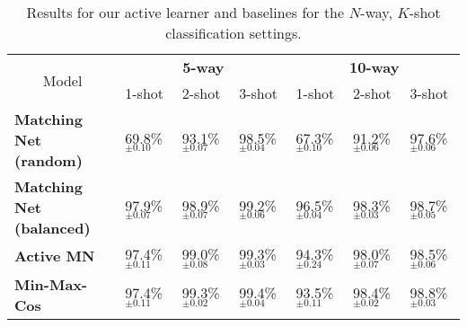 

\begin{table*}[]
\centering
\caption{Results for our active learner and baselines for the $N$-way, $K$-shot classification settings.}
\label{tab:res_kway_kshot}
\begin{tabular}{@{}lllllll@{}}
\toprule
\multicolumn{1}{c}{\multirow{2}{*}{Model}} & \multicolumn{3}{c}{\textbf{5-way}} & \multicolumn{3}{c}{\textbf{10-way}} \\ \cmidrule(l){2-7} 
\multicolumn{1}{c}{}                       & 1-shot     & 2-shot    & 3-shot    & 1-shot     & 2-shot     & 3-shot    \\ \midrule
\textbf{Matching Net (random)} & 69.8\%$_{\pm 0.10}$     & 93.1\%$_{\pm 0.07}$    & 98.5\%$_{\pm 0.04}$ & 67.3\%$_{\pm 0.10}$  & 91.2\%$_{\pm 0.06}$ & 97.6\%$_{\pm 0.06}$    \\
\textbf{Matching Net (balanced)} & 97.9\%$_{\pm 0.07}$     & 98.9\%$_{\pm 0.07}$    & 99.2\%$_{\pm 0.06}$    & 96.5\%$_{\pm 0.04}$     & 98.3\%$_{\pm 0.03}$    & 98.7\%$_{\pm 0.05}$    \\
\textbf{Active MN} & 97.4\%$_{\pm 0.11}$     & 99.0\%$_{\pm 0.08}$    & 99.3\%$_{\pm 0.03}$    & 94.3\%$_{\pm 0.24}$    & 98.0\%$_{\pm 0.07}$     & 98.5\%$_{\pm 0.06}$    \\
\midrule
\textbf{Min-Max-Cos} & 97.4\%$_{\pm 0.11}$     & 99.3\%$_{\pm 0.02}$    & 99.4\%$_{\pm 0.04}$    & 93.5\%$_{\pm 0.11}$    & 98.4\%$_{\pm 0.02}$     & 98.8\%$_{\pm 0.03}$    \\ \bottomrule
\end{tabular}
\vspace{-0.25cm}
\end{table*}

